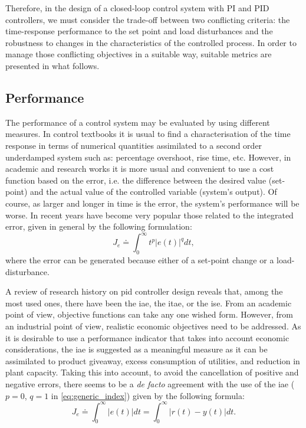 Therefore, in the design of a closed-loop control system with PI and PID controllers, we must consider the trade-off between two conflicting criteria: the time-response performance to the set point and load disturbances and the robustness to changes in the characteristics of the controlled process. In order to manage those conflicting objectives in a suitable way, suitable metrics are presented in what follows.
 
\subsection{Performance}
%
The performance of a control system may be evaluated by using different measures. In control textbooks it is usual to find a characterisation of the time response in terms of numerical quantities assimilated to a second order underdamped system such as: percentage overshoot, rise time, etc. However, in academic and research works it is more usual and convenient to use a cost function based on the error, i.e. the difference between the desired value (set-point) and the actual value of the controlled variable (system's output).  Of course, as larger and longer in time is the error, the system's performance will be worse. In recent years have become very popular those related to the integrated error, given in general by the following formulation:
%
\begin{equation}
	J_{e} \doteq \int^{\infty}_{0} t^p \left|e(t)\right|^q dt,  \label{eq:generic_index}
\end{equation}
%
where the error can be generated because either of a set-point change or a load-disturbance.

A review of research history on \gls{pid} controller design reveals that, among the most used ones, there have been the \gls{iae}, the \gls{itae}, or the \gls{ise}. From an academic point of view, objective functions can take any one wished form. However, from an industrial point of view, realistic economic objectives need to be addressed. As it is desirable to use a performance indicator that takes into account economic considerations, the \gls{iae} is suggested \citet{Shinskey2002} as a meaningful measure as it can be assimilated to product giveaway, excess consumption of utilities, and reduction in plant capacity. Taking this into account, to avoid the cancellation of positive and negative errors, there seems to be a \emph{de facto} agreement with the use of the \gls{iae} ($p=0$, $q=1$ in \ref{eq:generic_index}) given by the following formula:
%
\begin{equation}
	J_e \doteq \int^{\infty}_{0} \left|e(t) \right| dt = \int^{\infty}_{0} \left|r(t)-y(t) \right| dt. 
\end{equation}
%

